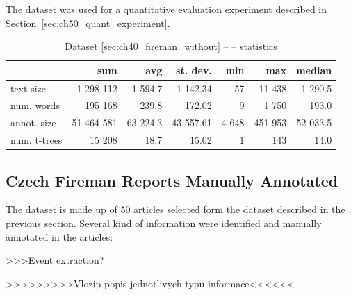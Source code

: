 The dataset was used for a quantitative evaluation experiment described in Section~\ref{sec:ch50_quant_experiment}. 


\begin{table}
\centering
\begin{tabular}{|l|r|r|r|r|r|r|}
\hline
 & sum & avg & st. dev. & min & max & median\\
\hline
text size    &  1 298 112 &  1 594.7 &  1 142.34 &    57 &  11 438 &  1 290.5\\
num. words   &    195 168 &    239.8 &    172.02 &     9 &   1 750 &    193.0\\
annot. size  & 51 464 581 & 63 224.3 & 43 557.61 & 4 648 & 451 953 & 52 033.5\\
num. t-trees &     15 208 &     18.7 &     15.02 &     1 &     143 &     14.0\\
\hline
\end{tabular}
\caption{Dataset \ref{sec:ch40_fireman_without} --  -- statistics} \label{tab:ch40_fire_without}
\end{table}


\subsection{Czech Fireman Reports Manually Annotated} \label{sec:ch40_fireman_annotated}

The dataset is made up of 50 articles selected form the dataset described in the previous section. Several kind of information were identified and manually annotated in the articles:

>>>Event extraction?

>>>>>>>>>Vlozip popis jednotlivych typu informace<<<<<<

